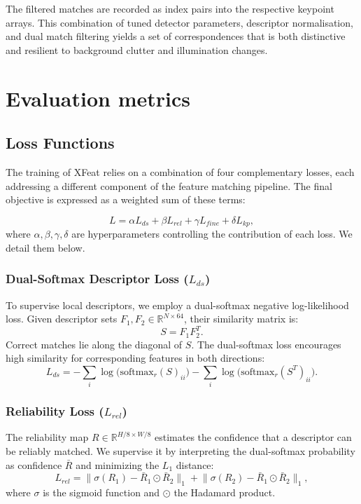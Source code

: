 The filtered matches are recorded as index pairs into the respective keypoint
arrays. This combination of tuned detector parameters, descriptor
normalisation, and dual match filtering yields a set of correspondences that is
both distinctive and resilient to background clutter and illumination changes.
\section{Evaluation metrics} %
\subsection{Loss Functions}

The training of XFeat relies on a combination of four complementary losses,
each addressing a different component of the feature matching pipeline. The
final objective is expressed as a weighted sum of these terms:

\begin{equation}
    L = \alpha L_{ds} + \beta L_{rel} + \gamma L_{fine} + \delta L_{kp},
\end{equation}
where $\alpha, \beta, \gamma, \delta$ are hyperparameters controlling the contribution of each loss. We detail them below.

\subsubsection{Dual-Softmax Descriptor Loss ($L_{ds}$)}
To supervise local descriptors, we employ a dual-softmax negative log-likelihood loss.
Given descriptor sets $F_1, F_2 \in \mathbb{R}^{N \times 64}$, their similarity matrix is:
\begin{equation}
    S = F_1 F_2^{T}.
\end{equation}
Correct matches lie along the diagonal of $S$. The dual-softmax loss encourages high similarity for corresponding features in both directions:
\begin{equation}
    L_{ds} = - \sum_i \log \big( \text{softmax}_r(S)_{ii} \big)
    - \sum_i \log \big( \text{softmax}_r(S^T)_{ii} \big).
\end{equation}

\subsubsection{Reliability Loss ($L_{rel}$)}
The reliability map $R \in \mathbb{R}^{H/8 \times W/8}$ estimates the confidence that a descriptor can be reliably matched.
We supervise it by interpreting the dual-softmax probability as confidence $\bar{R}$ and minimizing the $L_1$ distance:
\begin{equation}
    L_{rel} = \lVert \sigma(R_1) - \bar{R}_1 \odot \bar{R}_2 \rVert_1 +
    \lVert \sigma(R_2) - \bar{R}_1 \odot \bar{R}_2 \rVert_1,
\end{equation}
where $\sigma$ is the sigmoid function and $\odot$ the Hadamard product.

